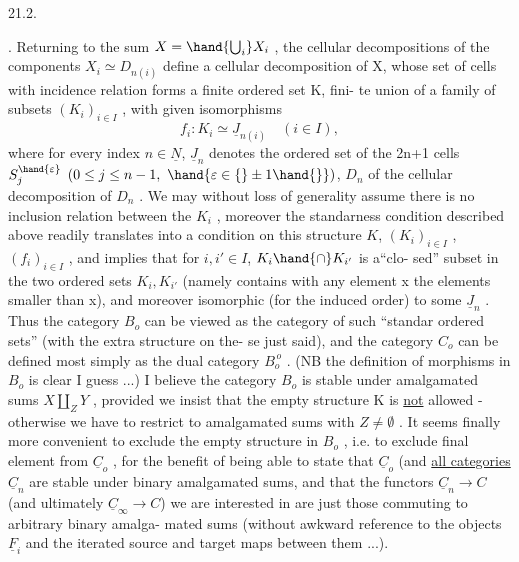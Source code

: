 21.2.

. Returning to the sum $X = \hand{\bigcup_i}X_i$ , the cellular decompositions
of the components $X_i \simeq D_{n(i)}$ define a cellular decomposition of X, whose
set of cells with incidence relation forms a finite ordered set K, fini-%
te union of a family of subsets $(K_i)_{i\in I}$ , with given isomorphisms
\[ f_i : K_i \simeq \underline{J}_{n(i)} \quad (i\in I) , \]
where for every index $n\in \underline{N}$, $\underline{J}_n$ denotes the ordered set of the 2n+1
cells $S_j^{\hand{\varepsilon}}$ $(0\leq j\leq n-1,\ \hand{\varepsilon\in\{}\pm 1\hand{\}})$, $D_n$ of the   cellular decomposition
of $D_n$ . We may without loss of generality assume there is no inclusion
relation between the $K_i$ , moreover the standarness condition described
above readily translates into a condition on this structure
$K$, $(K_i)_{i\in I}$ , $(f_i)_{i\in I}$ , and implies that for $i,i'\in I$, $K_i\hand{\cap}K_{i'}$ is a``clo-%
sed'' subset in the two ordered sets $K_i,K_{i'}$ (namely contains with any
element x the elements smaller than x), and moreover isomorphic (for the
induced order) to some $\underline{J}_n$ . Thus the category $B_o$  can be viewed as the
category of such ``standar ordered sets'' (with the extra structure on the-%
se just said), and the category $C_o$ can be defined most simply as the
dual category $B_o^{\,o}$ . (NB the definition of morphisms in $B_o$ is clear I
guess ...) I believe the category $B_o$ is stable under amalgamated sums
$X\amalg_Z Y$ , provided  we insist that the empty structure K is \uline{not} allowed -
otherwise we have to  restrict to amalgamated sums with $Z \neq \emptyset$ .
It seems finally more convenient to exclude the empty structure in $B_o$ ,
i.e. to exclude final element from $\underline{C}_o$ , for the benefit of being able to
state that $\underline{C}_o$ (and \uline{all categories $\underline{C}_n$}\hand{*}    are stable under binary
amalgamated sums, and that the functors $\underline{C}_n\to C$ (and ultimately $\underline{C}_\infty\to C$)
we are interested in are just those commuting to arbitrary binary amalga-%
mated sums (without  awkward reference to the objects $\underline{F}_i$ and the
iterated source and target maps between them ...).

